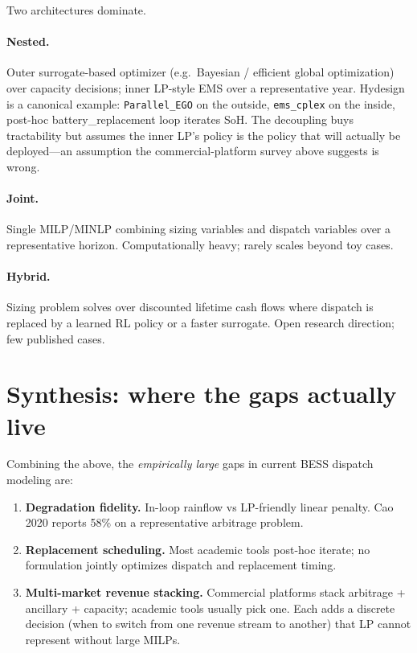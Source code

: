 \documentclass[11pt]{article}
\begin{document}
Two architectures dominate.

\paragraph{Nested.} Outer surrogate-based optimizer (e.g.\ Bayesian / efficient global optimization) over capacity decisions; inner LP-style EMS over a representative year. Hydesign \citep{murcia2024hydesign} is a canonical example: \texttt{Parallel\_EGO} on the outside, \texttt{ems\_cplex} on the inside, post-hoc battery\_replacement loop iterates SoH. The decoupling buys tractability but assumes the inner LP's policy is the policy that will actually be deployed---an assumption the commercial-platform survey above suggests is wrong.

\paragraph{Joint.} Single MILP/MINLP combining sizing variables and dispatch variables over a representative horizon. Computationally heavy; rarely scales beyond toy cases.

\paragraph{Hybrid.} Sizing problem solves over discounted lifetime cash flows where dispatch is replaced by a learned RL policy or a faster surrogate. Open research direction; few published cases.

\section{Synthesis: where the gaps actually live}

Combining the above, the \emph{empirically large} gaps in current BESS dispatch modeling are:

\begin{enumerate}
\item \textbf{Degradation fidelity.} In-loop rainflow vs LP-friendly linear penalty. Cao 2020 reports 58\% on a representative arbitrage problem.
\item \textbf{Replacement scheduling.} Most academic tools post-hoc iterate; no formulation jointly optimizes dispatch and replacement timing.
\item \textbf{Multi-market revenue stacking.} Commercial platforms stack arbitrage + ancillary + capacity; academic tools usually pick one. Each adds a discrete decision (when to switch from one revenue stream to another) that LP cannot represent without large MILPs.
\end{enumerate}
\end{document}
